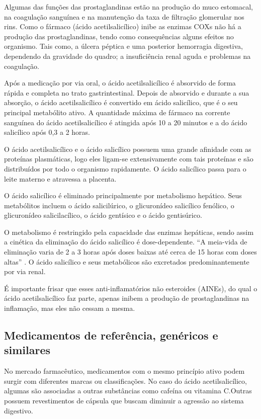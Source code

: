 Algumas das funções das prostaglandinas estão na produção do muco estomacal, na coagulação sanguínea e na
manutenção da taxa de filtração glomerular nos rins. Como o fármaco (ácido acetilsalicílico) inibe as
enzimas COXs não há a produção das prostaglandinas, tendo como consequências alguns efeitos no organismo.
Tais como, a úlcera péptica e uma posterior hemorragia digestiva, dependendo da gravidade do quadro; a
insuficiência renal aguda e problemas na coagulação. 

Após a medicação por via oral, o ácido acetilsalicílico é absorvido de forma rápida e completa no trato
gastrintestinal. Depois de absorvido e durante a sua absorção, o ácido acetilsalicílico é convertido em
ácido salicílico, que é o seu principal metabólito ativo. A quantidade máxima de fármaco na corrente
sanguínea do ácido acetilsalicílico é atingida após 10 a 20 minutos e a do ácido salicílico após 0,3 a 2
horas. 

O ácido acetilsalicílico e o ácido salicílico possuem uma grande afinidade com as proteínas plasmáticas,
logo eles ligam-se extensivamente com tais proteínas e são distribuídos por todo o organismo rapidamente.
O ácido salicílico passa para o leite materno e atravessa a placenta.

O ácido salicílico é eliminado principalmente por metabolismo hepático. Seus metabólitos incluem o ácido
salicilúrico, o glicuronídeo salicílico fenólico, o glicuronídeo salicilacílico, o ácido gentísico e o
ácido gentisúrico.

O metabolismo é restringido pela capacidade das enzimas hepáticas, sendo assim a cinética da eliminação
do ácido salicílico é dose-dependente. “A meia-vida de eliminação varia de 2 a 3 horas após doses baixas
até cerca de 15 horas com doses altas” \cite{bulaaspirina}. O ácido salicílico e seus metabólicos são
excretados predominantemente por via renal. 

É importante frisar que esses anti-inflamatórios não esteroides (AINEs), do qual o ácido acetilsalicílico
faz parte, apenas inibem a produção de prostaglandinas na inflamação, mas eles não cessam a mesma.

\subsection{Medicamentos de referência, genéricos e similares}\label{refgensim}

No mercado farmacêutico, medicamentos com o mesmo princípio ativo podem surgir com diferentes marcas ou
classificações. No caso do ácido acetilsalicílico, algumas são associadas a outras substâncias como cafeína ou
vitamina C.Outras possuem revestimentos de cápsula que buscam diminuir a agressão ao sistema digestivo.
\cite{prade2006}

